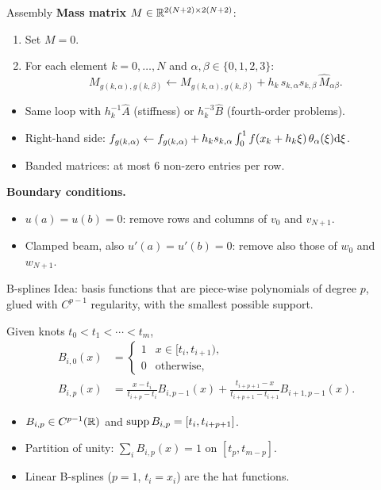 \begin{frame}{Assembly}
    \textbf{Mass matrix} $M \in {\mathbb R}^{2(N+2)\times 2(N+2)}$:
    \begin{enumerate}
        \item Set $M = 0$.
        \item For each element $k = 0, \dots, N$ and $\alpha, \beta \in \{0,1,2,3\}$:
              \[
                  M_{g(k,\alpha), g(k,\beta)} \gets M_{g(k,\alpha), g(k,\beta)} + h_k\, s_{k,\alpha} s_{k,\beta}\, \widehat M_{\alpha\beta}.
              \]
    \end{enumerate}
    \begin{itemize}
        \item Same loop with $h_k^{-1}\widehat A$ (stiffness) or $h_k^{-3} \widehat B$ (fourth-order problems).
        \item Right-hand side: $f_{g(k,\alpha)} \gets f_{g(k,\alpha)} + h_k s_{k,\alpha} \int_0^1 f(x_k + h_k\xi)\, \theta_\alpha(\xi){\mathrm d}\xi$.
        \item Banded matrices: at most $6$ non-zero entries per row.
    \end{itemize}
    \textbf{Boundary conditions.}
    \begin{itemize}
        \item $u(a) = u(b) = 0$: remove rows and columns of $v_0$ and $v_{N+1}$.
        \item Clamped beam, also $u'(a) = u'(b) = 0$: remove also those of $w_0$ and $w_{N+1}$.
    \end{itemize}
\end{frame}

\begin{frame}{B-splines}
    Idea: basis functions that are piece-wise polynomials of degree $p$,\\ glued with $C^{p-1}$ regularity, with the \alert{smallest possible support}.
    \begin{definition}
        Given knots $t_0 < t_1 < \cdots < t_m$,
        \begin{align*}
            B_{i,0}(x) & = \begin{cases} 1 & x \in [t_i, t_{i+1}), \\ 0 & \text{otherwise,} \end{cases}                           \\
            B_{i,p}(x) & = \frac{x - t_i}{t_{i+p} - t_i} B_{i,p-1}(x) + \frac{t_{i+p+1} - x}{t_{i+p+1} - t_{i+1}} B_{i+1,p-1}(x).
        \end{align*}
    \end{definition}
    \begin{itemize}
        \item $B_{i,p} \in C^{p-1}({\mathbb R})$ and $\operatorname{supp} B_{i,p} = [t_i, t_{i+p+1}]$.
        \item Partition of unity: $\sum_i B_{i,p}(x) = 1$ on $[t_p, t_{m-p}]$.
        \item Linear B-splines ($p = 1$, $t_i = x_i$) are the hat functions.
    \end{itemize}
\end{frame}

